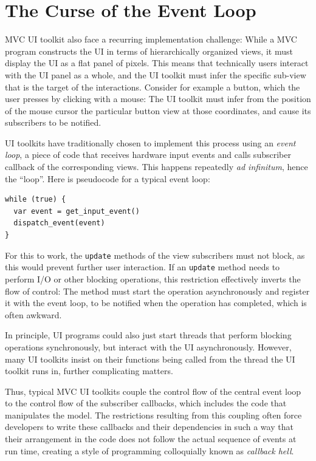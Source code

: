 \documentclass[sigplan,review,screen]{acmart}
\begin{document}
\section{The Curse of the Event Loop}
\label{sec:event-loop}

MVC UI toolkit also face a recurring implementation challenge: While a
MVC program constructs the UI in terms of hierarchically organized
views, it must display the UI as a flat panel of pixels.  This means
that technically users interact with the UI panel as a whole, and the
UI toolkit must infer the specific sub-view that is the target of the interactions.
Consider for example a button, which the user presses by clicking with
a mouse: The UI toolkit must infer from the position of the mouse
cursor the particular button view at those coordinates, and cause its
subscribers to be notified.

UI toolkits have traditionally chosen to implement this process using
an \textit{event loop}, a piece of code that receives hardware input
events and calls subscriber callback of the corresponding
views.  This happens repeatedly \textit{ad infinitum}, hence the
``loop''.  Here is pseudocode for a typical event loop:
%
\begin{verbatim}
while (true) {
  var event = get_input_event()
  dispatch_event(event)
}
\end{verbatim}
%
For this to work, the \texttt{update} methods of the view
subscribers must not block, as this would prevent further user
interaction.  If an \texttt{update} method needs to perform I/O or
other blocking operations, this restriction effectively inverts the
flow of control: The method must start the operation asynchronously
and register it with the event loop, to be notified when the operation
has completed, which is often awkward.

In principle, UI programs could also just start threads that perform
blocking operations synchronously, but interact with the UI
asynchronously.  However, many UI toolkits insist on their functions
being called from the thread the UI toolkit runs in, further
complicating matters.

Thus, typical MVC UI toolkits couple the control flow of the
central event loop to the control flow of the subscriber callbacks,
which includes the code that manipulates the model.  The restrictions
resulting from this coupling often force developers to write these
callbacks and their dependencies in such a way that their arrangement
in the code does not follow the actual sequence of events at run time,
creating a style of programming colloquially known as \textit{callback
  hell}.
\end{document}

